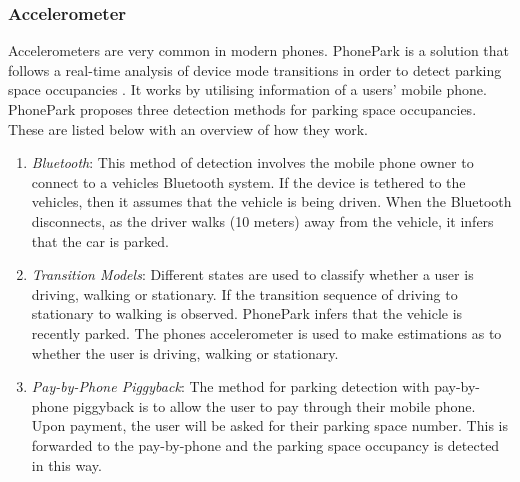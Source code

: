 \subsubsection*{Accelerometer}
Accelerometers are very common in modern phones. PhonePark is a solution that follows a real-time analysis of device mode transitions in order to detect parking space occupancies \citep{xu_real-time_2013}. It works by utilising information of a users' mobile phone. PhonePark proposes three detection methods for parking space occupancies. These are listed below with an overview of how they work.

\begin{enumerate}
    \item \textit{Bluetooth}: This method of detection involves the mobile phone owner to connect to a vehicles Bluetooth system. If the device is tethered to the vehicles, then it assumes that the vehicle is being driven. When the Bluetooth disconnects, as the driver walks (10 meters) away from the vehicle, it infers that the car is parked. 
    \item \textit{Transition Models}: Different states are used to classify whether a user is driving, walking or stationary. If the transition sequence of driving to stationary to walking is observed. PhonePark infers that the vehicle is recently parked. The phones accelerometer is used to make estimations as to whether the user is driving, walking or stationary.
    \item \textit{Pay-by-Phone Piggyback}: The method for parking detection with pay-by-phone piggyback is to allow the user to pay through their mobile phone. Upon payment, the user will be asked for their parking space number. This is forwarded to the pay-by-phone and the parking space occupancy is detected in this way.
\end{enumerate}
